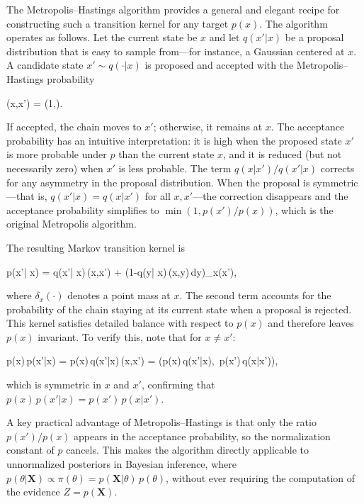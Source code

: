 The Metropolis--Hastings algorithm provides a general and elegant recipe for constructing such a transition kernel for any target $p(x)$. The algorithm operates as follows. Let the current state be $x$ and let $q(x'| x)$ be a proposal distribution that is easy to sample from---for instance, a Gaussian centered at $x$. A candidate state $x'\sim q(\cdot| x)$ is proposed and accepted with the Metropolis--Hastings probability
\begin{myequation}
\alpha(x,x')
=
\min\!\left(1,\right).
\end{myequation}
If accepted, the chain moves to $x'$; otherwise, it remains at $x$. The acceptance probability has an intuitive interpretation: it is high when the proposed state $x'$ is more probable under $p$ than the current state $x$, and it is reduced (but not necessarily zero) when $x'$ is less probable. The term $q(x|x')/q(x'|x)$ corrects for any asymmetry in the proposal distribution. When the proposal is symmetric---that is, $q(x'|x) = q(x|x')$ for all $x,x'$---the correction disappears and the acceptance probability simplifies to $\min(1, p(x')/p(x))$, which is the original Metropolis algorithm.

The resulting Markov transition kernel is
\begin{myequation}
p(x'| x)
=
q(x'| x)\,\alpha(x,x')
+
\left(1-\int q(y| x)\,\alpha(x,y)\,dy\right)\delta_{x}(x'),
\end{myequation}
where $\delta_x(\cdot)$ denotes a point mass at $x$. The second term accounts for the probability of the chain staying at its current state when a proposal is rejected. This kernel satisfies detailed balance with respect to $p(x)$ and therefore leaves $p(x)$ invariant. To verify this, note that for $x \neq x'$:
\begin{myequation}
p(x)\,p(x'|x) = p(x)\,q(x'|x)\,\alpha(x,x') = \min\!\left(p(x)\,q(x'|x),\, p(x')\,q(x|x')\right),
\end{myequation}
which is symmetric in $x$ and $x'$, confirming that $p(x)\,p(x'|x) = p(x')\,p(x|x')$.

A key practical advantage of Metropolis--Hastings is that only the ratio $p(x')/p(x)$ appears in the acceptance probability, so the normalization constant of $p$ cancels. This makes the algorithm directly applicable to unnormalized posteriors in Bayesian inference, where $p(\theta|\mathbf{X}) \propto \pi(\theta) = p(\mathbf{X}|\theta)\,p(\theta)$, without ever requiring the computation of the evidence $Z = p(\mathbf{X})$.

